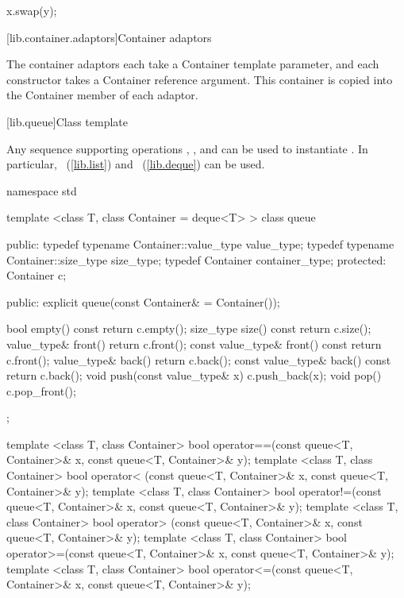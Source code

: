 \begin{itemdescr}
\pnum
\effects
\begin{codeblock}
    x.swap(y);
\end{codeblock}
\end{itemdescr}

[lib.container.adaptors]{Container adaptors}

\pnum
The container adaptors each take a Container template parameter, and each
constructor takes a Container reference argument. This container is copied
into the Container member of each adaptor.

[lib.queue]{Class template }

\pnum
{}%
Any sequence supporting operations
,
,
and
can be used to instantiate
.
In particular,
~(\ref{lib.list})
and
~(\ref{lib.deque})
can be used.

\begin{codeblock}
namespace std {
  template <class T, class Container = deque<T> >
  class queue {
  public:
    typedef typename Container::value_type            value_type;
    typedef typename Container::size_type             size_type;
    typedef          Container                        container_type;
  protected:
    Container c;

  public:
    explicit queue(const Container& = Container());

    bool      empty() const             { return c.empty(); }
    size_type size()  const             { return c.size(); }
    value_type&       front()           { return c.front(); }
    const value_type& front() const     { return c.front(); }
    value_type&       back()            { return c.back(); }
    const value_type& back() const      { return c.back(); }
    void push(const value_type& x)      { c.push_back(x); }
    void pop()                          { c.pop_front(); }
  };

  template <class T, class Container>
    bool operator==(const queue<T, Container>& x,
                    const queue<T, Container>& y);
  template <class T, class Container>
    bool operator< (const queue<T, Container>& x,
                    const queue<T, Container>& y);
  template <class T, class Container>
    bool operator!=(const queue<T, Container>& x,
                    const queue<T, Container>& y);
  template <class T, class Container>
    bool operator> (const queue<T, Container>& x,
                    const queue<T, Container>& y);
  template <class T, class Container>
    bool operator>=(const queue<T, Container>& x,
                    const queue<T, Container>& y);
  template <class T, class Container>
    bool operator<=(const queue<T, Container>& x,
                    const queue<T, Container>& y);
}
\end{codeblock}

